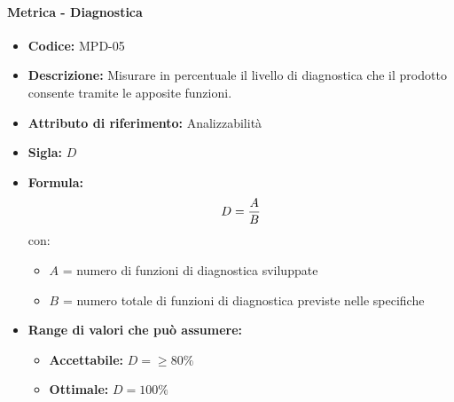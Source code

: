         \paragraph{Metrica - Diagnostica} 
           \begin{itemize}
          \item  \textbf{Codice:} MPD-05
          \item  \textbf{Descrizione:} Misurare in percentuale il livello di diagnostica che il prodotto consente tramite le apposite funzioni.
          \item  \textbf{Attributo di riferimento:} Analizzabilità
         \item   \textbf{Sigla:} $D$
          \item  \textbf{Formula:} $$D = {A \over B}$$
          con:
          \begin{itemize}
            \item $A$ = numero di funzioni di diagnostica sviluppate
            \item $B$ = numero totale di funzioni di diagnostica previste nelle specifiche
          \end{itemize}

        \item \textbf{Range di valori che può assumere:}
        \begin{itemize}
            \item \textbf{Accettabile:} $D = \geq80\% $
            \item \textbf{Ottimale:} $D = 100\% $
        \end{itemize}
       \end{itemize}
              
\newpage %

